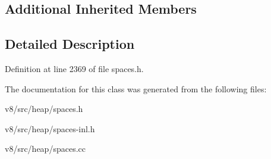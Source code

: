 \subsection*{Additional Inherited Members}


\subsection{Detailed Description}


Definition at line 2369 of file spaces.\+h.



The documentation for this class was generated from the following files\+:\begin{DoxyCompactItemize}
\item 
v8/src/heap/spaces.\+h\item 
v8/src/heap/spaces-\/inl.\+h\item 
v8/src/heap/spaces.\+cc\end{DoxyCompactItemize}
